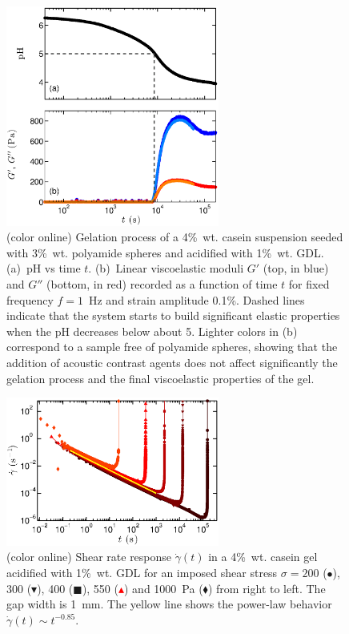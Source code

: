 \documentclass[twocolumn,superscriptaddress,showpacs,preprintnumbers,amsmath,amssymb,prl]{revtex4}
\newcommand\gp{\dot\gamma}
\begin{document}
\begin{figure}[t]
\centering
\includegraphics[width=7cm,clip]{SuppFig1.eps}
\caption{(color online) Gelation process of a 4\%~wt. casein suspension seeded with 3\%~wt. polyamide spheres and acidified with 1\%~wt. GDL. (a)~pH vs time $t$. (b)~Linear viscoelastic moduli $G'$ (top, in blue) and $G''$ (bottom, in red) recorded as a function of time $t$ for fixed frequency $f=1$~Hz and strain amplitude 0.1\%. Dashed lines indicate that the system starts to build significant elastic properties when the pH decreases below about 5. Lighter colors in (b) correspond to a sample free of polyamide spheres, showing that the addition of acoustic contrast agents does not affect significantly the gelation process and the final viscoelastic properties of the gel.
\label{suppfig1}}
\end{figure} 

\begin{figure}[h]
\centering
\includegraphics[width=7cm,clip]{SuppFig2.eps}
\caption{(color online) Shear rate response $\gp(t)$ in a 4\%~wt. casein gel acidified with 1\%~wt. GDL for an imposed shear stress $\sigma=200$ (\textcolor{red!25!black}{$\bullet$}), 300 (\textcolor{red!50!black}{$\blacktriangledown$}), 400 (\textcolor{red!75!black}{$\blacksquare$}), 550 (\textcolor{red}{$\blacktriangle$}) and 1000~Pa (\textcolor{orange!50!red}{$\blacklozenge$}) from right to left. The gap width is 1~mm. The yellow line shows the power-law behavior $\gp(t)\sim t^{-0.85}$.
\label{suppfig2}}
\end{figure}
\end{document}
